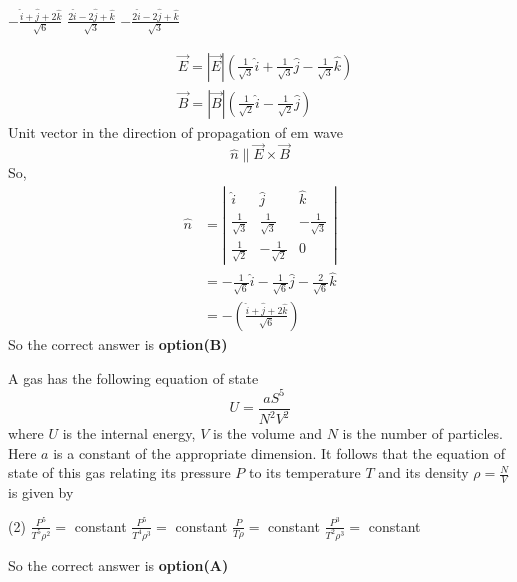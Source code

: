 \begin{questions}
\begin{tasks}
	\task[\textbf{B.}] $-\frac{\hat{i}+\hat{j}+2 \hat{k}}{\sqrt{6}}$
	\task[\textbf{C.}] $\frac{2 \hat{i}-2 \hat{j}+\hat{k}}{\sqrt{3}}$
	\task[\textbf{D.}] $-\frac{2 \hat{i}-2 \hat{j}+\hat{k}}{\sqrt{3}}$
\end{tasks}
\begin{answer}
	$$
	\begin{aligned}
	&\vec{E}=|\vec{E}|\left(\frac{1}{\sqrt{3}} \hat{i}+\frac{1}{\sqrt{3}} \hat{j}-\frac{1}{\sqrt{3}} \hat{k}\right) \\
	&\vec{B}=|\vec{B}|\left(\frac{1}{\sqrt{2}} \hat{i}-\frac{1}{\sqrt{2}} \hat{j}\right)
	\end{aligned}
	$$
	Unit vector in the direction of propagation of em wave 
	$$
	\hat{n} \| \vec{E} \times \vec{B}
	$$
	So,
	$$
	\begin{aligned}
	\hat{n} &=\left|\begin{array}{ccc}
	\hat{i} & \hat{j} & \hat{k} \\
	\frac{1}{\sqrt{3}} & \frac{1}{\sqrt{3}} & -\frac{1}{\sqrt{3}} \\
	\frac{1}{\sqrt{2}} & -\frac{1}{\sqrt{2}} & 0
	\end{array}\right| \\
	&=-\frac{1}{\sqrt{6}} \hat{i}-\frac{1}{\sqrt{6}} \hat{j}-\frac{2}{\sqrt{6}} \hat{k} \\
	&=-\left(\frac{\hat{i}+\hat{j}+2 \hat{k}}{\sqrt{6}}\right)
	\end{aligned}
	$$
	So the correct answer is \textbf{option(B)}
\end{answer}
\begin{minipage}{\textwidth}
	\question A gas has the following equation of state
	$$
	U=\frac{a S^{5}}{N^{2} V^{2}}
	$$
	where $U$ is the internal energy, $V$ is the volume and $N$ is the number of particles. Here $a$ is a constant of the appropriate dimension. It follows that the equation of state of this gas relating its pressure $P$ to its temperature $T$ and its density $\rho=\frac{N}{V}$ is given by
\end{minipage}
\begin{tasks}(2)
	\task[\textbf{A.}] $\frac{P^{5}}{T^{5} \rho^{2}}=$ constant
	\task[\textbf{B.}] $\frac{P^{5}}{T^{4} \rho^{3}}=$ constant
	\task[\textbf{C.}] $\frac{P}{T \rho}=$ constant
	\task[\textbf{D.}] $\frac{P^{3}}{T^{2} \rho^{3}}=$ constant
\end{tasks}
\begin{answer}
	So the correct answer is \textbf{option(A)}
\end{answer}

\end{questions}
